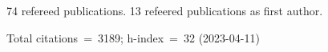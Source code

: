 74 refereed publications. 13 refeered publications as first author.

Total citations~=~3189; h-index~=~32 (2023-04-11)